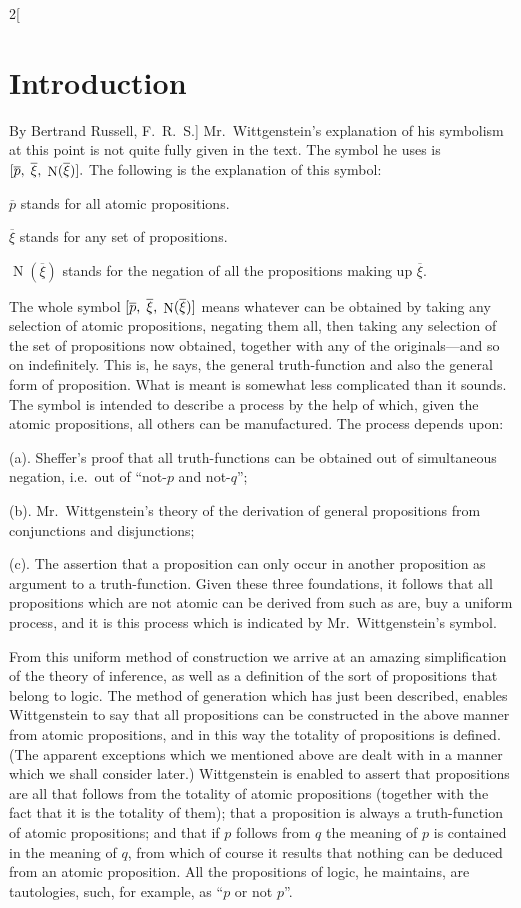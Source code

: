 \documentclass[oneside,openany,12pt]{book}
\newcommand{\nop}{\mathop{\mathrm{N}}}
\begin{document}
\begin{multicols}{2}[\section*{Introduction}By Bertrand Russell, F.\ R.\ S.]
Mr.\ Wittgenstein's explanation of his symbolism at this point is not quite fully given in the text. The symbol he uses is $[\overline{p},\thickspace \overline{\xi},\thickspace \nop(\overline{\xi})].$ The following is the explanation of this symbol:
\begin{description}[noitemsep,labelindent=1em,leftmargin=3em,rightmargin=1em]
  \item $\overline{p}$ stands for all atomic propositions.
  \item $\overline{\xi}$ stands for any set of propositions.
  \item $\nop(\overline{\xi})$ stands for the negation of all the propositions making up $\overline{\xi}$.
 \end{description}

The whole symbol $[\overline{p},\thickspace \overline{\xi},\thickspace \nop(\overline{\xi})]$ means whatever can be obtained by taking any selection of atomic propositions, negating them all, then taking any selection of the set of propositions now obtained, together with any of the originals---and so on indefinitely. This is, he says, the general truth-function and also the general form of proposition. What is meant is somewhat less complicated than it sounds. The symbol is intended to describe a process by the help of which, given the atomic propositions, all others can be manufactured. The process depends upon:

(a). Sheffer's proof that all truth-functions can be obtained out of simultaneous negation, i.e.\ out of ``not-$p$ and not-$q$'';

(b). Mr.\ Wittgenstein's theory of the derivation of general propositions from conjunctions and disjunctions;

(c). The assertion that a proposition can only occur in another proposition as argument to a truth-function. Given these three foundations, it follows that all propositions which are not atomic can be derived from such as are, buy a uniform process, and it is this process which is indicated by Mr.\ Wittgenstein's symbol.

From this uniform method of construction we arrive at an amazing simplification of the theory of inference, as well as a definition of the sort of propositions that belong to logic. The method of generation which has just been described, enables Wittgenstein to say that all propositions can be constructed in the above manner from atomic propositions, and in this way the totality of propositions is defined. (The apparent exceptions which we mentioned above are dealt with in a manner which we shall consider later.) Wittgenstein is enabled to assert that propositions are all that follows from the totality of atomic propositions (together with the fact that it is the totality of them); that a proposition is always a truth-function of atomic propositions; and that if $p$ follows from $q$ the meaning of $p$ is contained in the meaning of $q$, from which of course it results that nothing can be deduced from an atomic proposition. All the propositions of logic, he maintains, are tautologies, such, for example, as ``$p$ or not $p$''.


\end{multicols}
\end{document}
